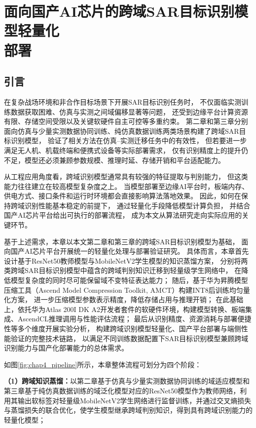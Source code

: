\chapter[面向国产AI芯片的跨域SAR目标识别模型轻量化部署]{面向国产AI芯片的跨域SAR目标识别模型轻量化\\部署}


\section{引言}

在复杂战场环境和非合作目标场景下开展SAR目标识别任务时，
不仅面临实测训练数据获取困难、仿真与实测之间域偏移显著等问题，
还受到边缘平台计算资源有限、存储空间受限以及关键软硬件自主可控等多重约束。
第二章和第三章分别面向仿真与少量实测数据协同训练、纯仿真数据训练两类场景构建了跨域SAR目标识别模型，
验证了相关方法在仿真--实测迁移任务中的有效性，
但若要进一步满足无人机、机载终端和便携式设备等实际部署需求，
仅有识别精度上的提升仍不足，模型还必须兼顾参数规模、推理时延、存储开销和平台适配能力。

从工程应用角度看，跨域识别模型通常具有较强的特征提取与判别能力，
但这类能力往往建立在较高模型复杂度之上。
当模型部署至边缘AI平台时，板端内存、供电方式、接口条件和运行时环境都会直接影响算法落地效果。
因此，如何在保持跨域识别性能基本稳定的前提下，
通过轻量化手段降低模型计算负担，
并结合国产AI芯片平台给出可执行的部署流程，
成为本文从算法研究走向实际应用的关键环节。

基于上述需求，本章以本文第二章和第三章的跨域SAR目标识别模型为基础，
面向国产AI芯片平台开展统一的轻量化处理与部署验证研究。
具体而言，本章首先设计基于ResNet50教师模型与MobileNetV2学生模型的知识蒸馏方案，
分别将两类跨域SAR目标识别模型中蕴含的跨域判别知识迁移到轻量级学生网络中，
在降低模型复杂度的同时尽可能保留域不变特征表达能力；
随后，基于华为昇腾模型压缩工具（Ascend Model Compression Toolkit, AMCT）构建INT8后训练均匀量化方案，
进一步压缩模型参数表示精度，降低存储占用与推理开销；
在此基础上，依托华为Atlas 200I DK A2开发者套件的软硬件环境，构建模型转换、板端集成、AscendCL推理调用与性能评估流程；
最后从识别精度、资源消耗与部署便捷性等多个维度开展实验分析，
构建跨域识别模型轻量化、国产平台部署与端侧性能验证的完整技术链路，
以满足不同训练数据配置下SAR目标识别模型兼顾跨域识别能力与国产化部署能力的总体需求。

如图\ref{fig:chap4_pipeline}所示，本章整体流程可划分为四个阶段：

\textbf{（1）跨域知识蒸馏：}以第二章基于仿真与少量实测数据协同训练的域适应模型和第三章基于纯仿真数据训练的域泛化模型对应的ResNet50模型作为教师网络，利用其输出软标签对轻量级MobileNetV2学生网络进行监督训练，并通过交叉熵损失与蒸馏损失的联合优化，使学生模型继承跨域判别知识，得到具有跨域识别能力的轻量化模型；

